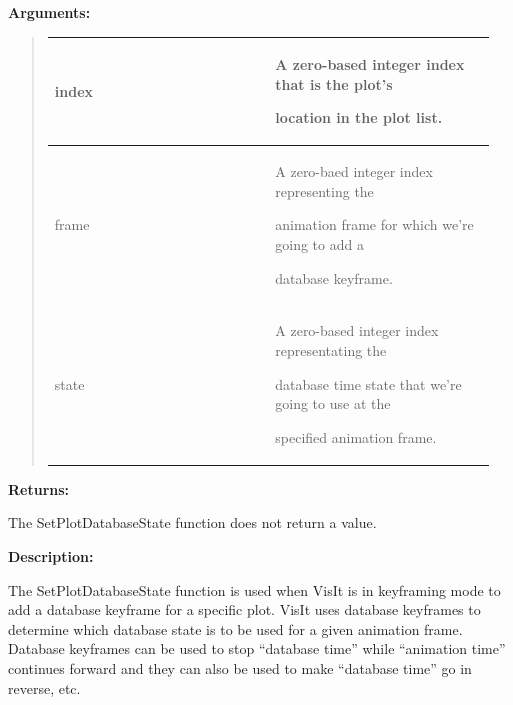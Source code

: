\documentclass[letterpaper,10pt,english]{sphinxmanual}
\begin{document}
\begin{DUlineblock}{0em}
\item[] 
\item[] \textbf{Arguments:}
\end{DUlineblock}
\begin{quote}

\begin{tabular}{|p{0.475\linewidth}|p{0.475\linewidth}|}
\hline

index
 & 
\begin{DUlineblock}{0em}
\item[] A zero-based integer index that is the plot's
\item[] location in the plot list.
\end{DUlineblock}
\\
\hline
frame
 & 
\begin{DUlineblock}{0em}
\item[] A zero-baed integer index representing the
\item[] animation frame for which we're going to add a
\item[] database keyframe.
\end{DUlineblock}
\\
\hline
state
 & 
\begin{DUlineblock}{0em}
\item[] A zero-based integer index representating the
\item[] database time state that we're going to use at the
\item[] specified animation frame.
\end{DUlineblock}
\\
\hline\end{tabular}

\end{quote}

\begin{DUlineblock}{0em}
\item[] 
\item[] \textbf{Returns:}
\item[] The SetPlotDatabaseState function does not return a value.
\item[] 
\item[] \textbf{Description:}
\item[] The SetPlotDatabaseState function is used when VisIt is in keyframing mode
to add a database keyframe for a specific plot. VisIt uses database
keyframes to determine which database state is to be used for a given
animation frame. Database keyframes can be used to stop ``database time''
while ``animation time'' continues forward and they can also be used to
make ``database time'' go in reverse, etc.
\end{DUlineblock}
\end{document}
